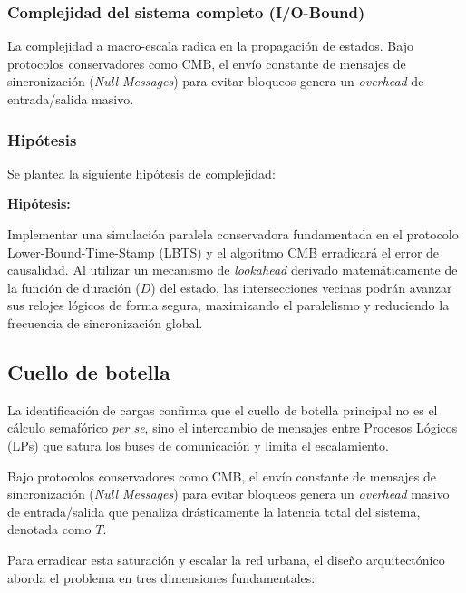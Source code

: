 \documentclass[12pt]{article}
\begin{document}
\subsubsection{Complejidad del sistema completo (I/O-Bound)}
La complejidad a macro-escala radica en la propagación de estados. Bajo protocolos conservadores como CMB, el envío constante de mensajes de sincronización (\textit{Null Messages}) para evitar bloqueos genera un \textit{overhead} de entrada/salida masivo.


\subsubsection{Hipótesis}

Se plantea la siguiente hipótesis de complejidad:

\textbf{Hipótesis:}

Implementar una simulación paralela conservadora fundamentada en el protocolo Lower-Bound-Time-Stamp (LBTS) y el algoritmo CMB erradicará el error de causalidad. Al utilizar un mecanismo de \textit{lookahead} derivado matemáticamente de la función de duración ($D$) del estado, las intersecciones vecinas podrán avanzar sus relojes lógicos de forma segura, maximizando el paralelismo y reduciendo la frecuencia de sincronización global.

\subsection{Cuello de botella}

La identificación de cargas confirma que el cuello de botella principal no es el cálculo semafórico \textit{per se}, sino el intercambio de mensajes entre Procesos Lógicos (LPs) que satura los buses de comunicación y limita el escalamiento.

Bajo protocolos conservadores como CMB, el envío constante de mensajes de sincronización (\textit{Null Messages}) para evitar bloqueos genera un \textit{overhead} masivo de entrada/salida que penaliza drásticamente la latencia total del sistema, denotada como $T$.

Para erradicar esta saturación y escalar la red urbana, el diseño arquitectónico aborda el problema en tres dimensiones fundamentales:
\end{document}
